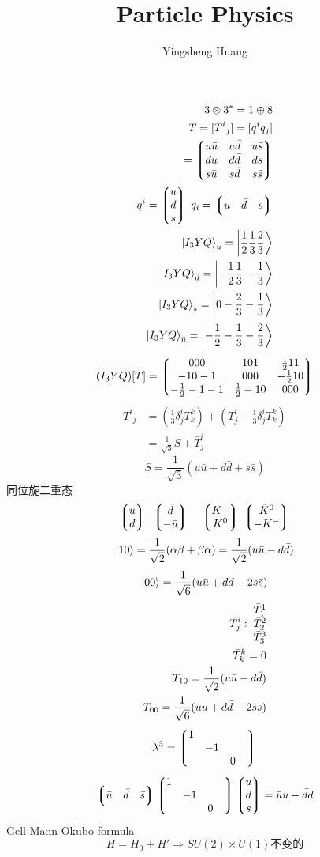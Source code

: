 \documentclass{article}
\title{Particle Physics}
\author{Yingsheng Huang}
\begin{document}
\maketitle
\begin{align*}
  3\otimes3^*=1\oplus8\\
  T=[T^i{}_j]=[q^iq_j]\\
  =\Pmqty{u\bar u&u\bar d&u\bar s\\d\bar u&d\bar d&d\bar s\\s\bar u&s\bar d&s\bar s}\\
  q^i=\Pmqty{u\\d\\s}\;q_i=\Pmqty{\bar u&\bar d&\bar s}\\
  \ket{I_3YQ}_u=\ket{\frac{1}{2}\frac{1}{3}\frac{2}{3}}\\
  \ket{I_3YQ}_d=\ket{-\frac{1}{2}\frac{1}{3}-\frac{1}{3}}\\
  \ket{I_3YQ}_s=\ket{0-\frac{2}{3}-\frac{1}{3}}\\
  \ket{I_3YQ}_{\bar u}=\ket{-\frac{1}{2}-\frac{1}{3}-\frac{2}{3}}
\end{align*}
$$(I_3YQ)[T]=\Pmqty{000&101&\frac{1}{2}11\\-10-1&000&-\frac{1}{2}10\\-\frac{1}{2}-1-1&\frac{1}{2}-10&000}$$
\begin{align*}
  T^i{}_j&=(\frac{1}{3}\delta^i_jT^k_k)+(T^i_j-\frac{1}{3}\delta^i_jT^k_k)\\
  &=\frac{1}{\sqrt{3}}S+\bar T^i_j
\end{align*}
$$S=\frac{1}{\sqrt{3}}(u\bar u+d\bar d+s\bar s)$$
同位旋二重态
$$\Pmqty{u\\d}\;\;\Pmqty{\bar d\\-\bar u}\;\;\;\;\Pmqty{K^+\\K^0}\;\Pmqty{\bar K^0\\-K^-}$$
$$\ket{10}=\frac{1}{\sqrt{2}}(\alpha\beta+\beta\alpha)=\frac{1}{\sqrt{2}}(u\bar u-d\bar d)$$
$$\ket{00}=\frac{1}{\sqrt{6}}(u\bar u+d\bar d-2s\bar s)$$
\begin{align*}
  \bar T^i_j: \;\mqty{\bar T^1_1\\\bar T^2_2\\\bar T^3_3}\\
  \bar T^k_k=0\\
  T_{10}=\frac{1}{\sqrt{2}}(u\bar u-d\bar d)\\
  T_{00}=\frac{1}{\sqrt{6}}(u\bar u+d\bar d-2s\bar s)
\end{align*}
$$\lambda^3=\Pmqty{1&&\\&-1&\\&&0&}$$
$$\Pmqty{\bar u&\bar d&\bar s}\Pmqty{1&&\\&-1&\\&&0&}\Pmqty{u\\d\\s}=\bar uu-\bar dd$$
Gell-Mann-Okubo formula
$$H=H_0+H'\Longrightarrow SU(2)\times U(1)不变的$$
\end{document}
